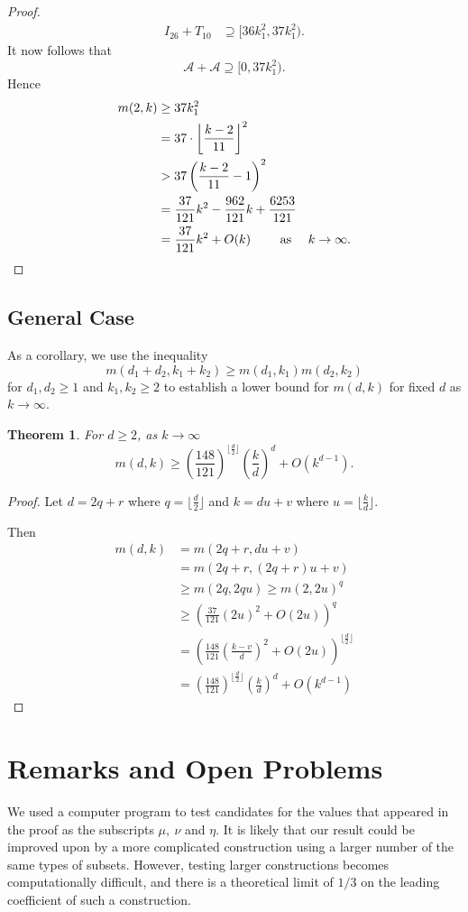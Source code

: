 \documentclass[11pt]{article}
\newtheorem{theorem}{Theorem}[section]
\theoremstyle{definition}
\begin{document}
\begin{proof}
\begin{align*}
I_{26} + T_{10}  &\supseteq [36k_1^2, 37k_1^2).
\end{align*}
It now follows that 
\[
\mathcal{A} + \mathcal{A} \supseteq [0, 37k_1^2).
\]
Hence
\begin{align*}
m(2,k) &\geq 37k_1^2\\
&= 37 \cdot \left \lfloor \frac{k - 2}{11}\right \rfloor^2\\
&> 37 \left(\frac{k - 2}{11} -1\right) ^2\\
&= \frac{37}{121}k^2-\frac{962}{121}k+\frac{6253}{121}\\
&= \frac{37}{121}k^2 + O(k)\qquad \text{ as }\quad k \to \infty. \qedhere
\end{align*}
\end{proof}
\subsection{General Case}
As a corollary, we use the inequality 
\[
m(d_1+d_2,k_1+k_2) \geq m(d_1,k_1)m(d_2,k_2)
\]
for $d_1, d_2 \geq 1$ and $k_1, k_2 \geq 2$ to establish a lower bound for $m(d,k)$ for fixed $d$ as $k \to \infty$.
\begin{theorem}
For $d \geq 2$, as $k \to \infty$ 
\[
m(d,k) \geq \left(\frac{148}{121}\right)^{\lfloor \frac{d}{2}\rfloor}\left(\frac{k}{d}\right)^d + O(k^{d-1}).
\]
\end{theorem}
\begin{proof}
Let $d = 2q +r$ where $q = \lfloor \frac{d}{2}\rfloor$ and $k = du +v$ where $u = \lfloor \frac{k}{d}\rfloor$.

Then 
\begin{align*}
m(d,k) &= m(2q+r, du +v)\\
&= m(2q+r, (2q+r)u +v)\\
&\geq m(2q, 2qu) \geq m(2, 2u)^q\\
&\geq \left(\frac{37}{121}(2u)^2+ O(2u)\right)^q \\
&= \left(\frac{148}{121} \left(\frac{k-v}{d}\right) ^2+ O(2u)\right)^{\lfloor \frac{d}{2}\rfloor}\\
&= \left(\frac{148}{121}\right)^{\lfloor \frac{d}{2}\rfloor}\left(\frac{k}{d}\right)^d + O(k^{d-1})
\end{align*}
\end{proof}
\section{Remarks and Open Problems}

We used a computer program to test candidates for the values that appeared in the proof as the subscripts $\mu,\ \nu$ and $\eta$.  It is likely that our result could be improved upon by a more complicated construction using a larger number of the same types of subsets.  However, testing larger constructions becomes computationally difficult, and there is a theoretical limit of $1/3$ on the leading coefficient of such a construction.
\end{document}
